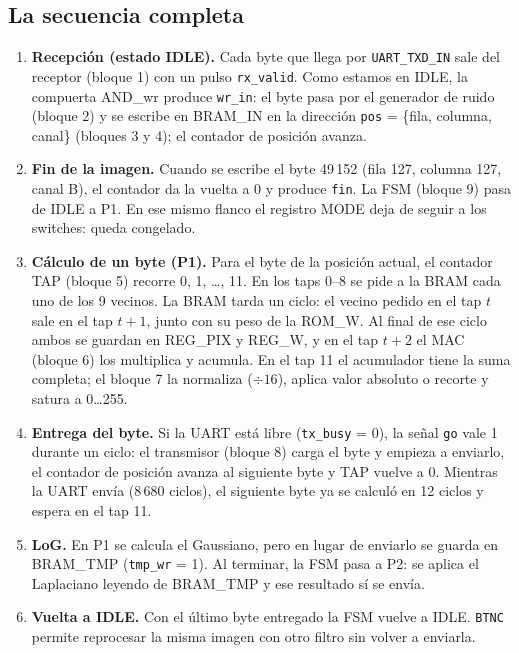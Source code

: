 \documentclass[11pt,a4paper]{article}
\newcommand{\sig}[1]{\texttt{\color{azul}#1}}
\newcommand{\bus}[1]{\texttt{#1}}
\begin{document}
\subsection{La secuencia completa}
\begin{enumerate}
\item \textbf{Recepción (estado IDLE).} Cada byte que llega por \bus{UART\_TXD\_IN} sale del receptor (bloque 1) con un pulso \sig{rx\_valid}. Como estamos en IDLE, la compuerta AND\_wr produce \sig{wr\_in}: el byte pasa por el generador de ruido (bloque 2) y se escribe en BRAM\_IN en la dirección \bus{pos} = \{fila, columna, canal\} (bloques 3 y 4); el contador de posición avanza.
\item \textbf{Fin de la imagen.} Cuando se escribe el byte 49\,152 (fila 127, columna 127, canal B), el contador da la vuelta a 0 y produce \sig{fin}. La FSM (bloque 9) pasa de IDLE a P1. En ese mismo flanco el registro MODE deja de seguir a los switches: queda congelado.
\item \textbf{Cálculo de un byte (P1).} Para el byte de la posición actual, el contador TAP (bloque 5) recorre 0, 1, …, 11. En los taps 0–8 se pide a la BRAM cada uno de los 9 vecinos. La BRAM tarda un ciclo: el vecino pedido en el tap $t$ sale en el tap $t+1$, junto con su peso de la ROM\_W. Al final de ese ciclo ambos se guardan en REG\_PIX y REG\_W, y en el tap $t+2$ el MAC (bloque 6) los multiplica y acumula. En el tap 11 el acumulador tiene la suma completa; el bloque 7 la normaliza ($\div16$), aplica valor absoluto o recorte y satura a 0…255.
\item \textbf{Entrega del byte.} Si la UART está libre (\sig{tx\_busy} = 0), la señal \sig{go} vale 1 durante un ciclo: el transmisor (bloque 8) carga el byte y empieza a enviarlo, el contador de posición avanza al siguiente byte y TAP vuelve a 0. Mientras la UART envía (8\,680 ciclos), el siguiente byte ya se calculó en 12 ciclos y espera en el tap 11.
\item \textbf{LoG.} En P1 se calcula el Gaussiano, pero en lugar de enviarlo se guarda en BRAM\_TMP (\sig{tmp\_wr} = 1). Al terminar, la FSM pasa a P2: se aplica el Laplaciano leyendo de BRAM\_TMP y ese resultado sí se envía.
\item \textbf{Vuelta a IDLE.} Con el último byte entregado la FSM vuelve a IDLE. \bus{BTNC} permite reprocesar la misma imagen con otro filtro sin volver a enviarla.
\end{enumerate}
\end{document}
